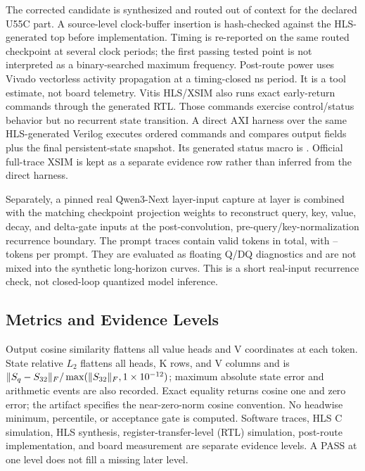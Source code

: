 \documentclass[conference]{IEEEtran}
\begin{document}
The corrected candidate is synthesized and routed out of context for the
declared U55C part. A source-level clock-buffer insertion is hash-checked
against the HLS-generated top before implementation. Timing is re-reported on
the same routed checkpoint at several clock periods; the first passing tested
point is not interpreted as a binary-searched maximum frequency. Post-route
power uses Vivado vectorless activity propagation at a timing-closed
\RsTwoRouteClosingPeriodNs{} ns period. It is a tool estimate, not board
telemetry. Vitis HLS/XSIM also runs
\CorrectedEZeroControlCosimCommands{} exact early-return commands through the
generated RTL. Those commands exercise control/status behavior but no recurrent
state transition. A direct AXI harness over the same HLS-generated Verilog
executes \RsTwoRtlTransactions{} ordered commands and compares
\RsTwoRtlOutputs{} output fields plus the final persistent-state snapshot.
Its generated status macro is \RsTwoRtlStatus{}. Official full-trace XSIM is
kept as a separate evidence row rather than inferred from the direct harness.

Separately, a pinned real Qwen3-Next layer-input capture at layer
\CorrectedQwenCaptureLayer{} is combined with the matching checkpoint
projection weights to reconstruct query, key, value, decay, and delta-gate
inputs at the post-convolution, pre-query/key-normalization recurrence
boundary. The \CorrectedQwenRecurrentPromptCount{} prompt traces contain
\CorrectedQwenRecurrentTotalTokens{} valid tokens in total, with
\CorrectedQwenRecurrentMinTokens{}--\CorrectedQwenRecurrentMaxTokens{} tokens
per prompt. They are evaluated as floating Q/DQ diagnostics and are not mixed
into the synthetic long-horizon curves. This is a short real-input recurrence
check, not closed-loop quantized model inference.

\subsection{Metrics and Evidence Levels}
Output cosine similarity flattens all value heads and V coordinates at each
token. State relative $L_2$ flattens all heads, K rows, and V columns and is
$\|S_q-S_{32}\|_F/\max(\|S_{32}\|_F,
1\times 10^{-12})$; maximum absolute state error and
arithmetic events are also recorded. Exact equality returns cosine one and zero
error; the artifact specifies the near-zero-norm cosine convention. No headwise
minimum, percentile, or acceptance gate is computed. Software traces, HLS C simulation, HLS
synthesis,
register-transfer-level (RTL) simulation, post-route implementation, and board
measurement are separate evidence levels. A PASS at one level does not fill a
missing later level.
\end{document}
